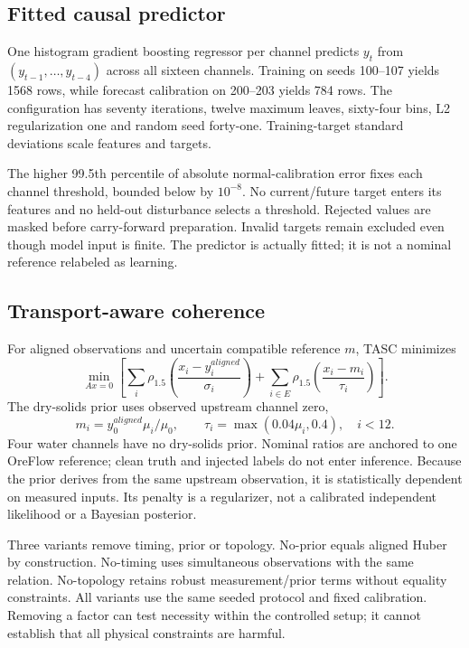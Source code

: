 \documentclass[11pt,a4paper]{article}
\begin{document}
\subsection{Fitted causal predictor}
One histogram gradient boosting regressor per channel predicts $y_t$ from $(y_{t-1},\ldots,y_{t-4})$ across all sixteen channels. Training on seeds 100--107 yields 1568 rows, while forecast calibration on 200--203 yields 784 rows. The configuration has seventy iterations, twelve maximum leaves, sixty-four bins, L2 regularization one and random seed forty-one. Training-target standard deviations scale features and targets.

The higher 99.5th percentile of absolute normal-calibration error fixes each channel threshold, bounded below by $10^{-8}$. No current/future target enters its features and no held-out disturbance selects a threshold. Rejected values are masked before carry-forward preparation. Invalid targets remain excluded even though model input is finite. The predictor is actually fitted; it is not a nominal reference relabeled as learning.

\subsection{Transport-aware coherence}
For aligned observations and uncertain compatible reference $m$, TASC minimizes
\begin{equation}
 \min_{Ax=0}\left[\sum_i\rho_{1.5}\left(\frac{x_i-y_i^{aligned}}{\sigma_i}\right)
 +\sum_{i\in E}\rho_{1.5}\left(\frac{x_i-m_i}{\tau_i}\right)\right].
\end{equation}
The dry-solids prior uses observed upstream channel zero,
\begin{equation}
 m_i=y_0^{aligned}\mu_i/\mu_0,\qquad
 \tau_i=\max(0.04\mu_i,0.4),\quad i<12.
\end{equation}
Four water channels have no dry-solids prior. Nominal ratios are anchored to one OreFlow reference; clean truth and injected labels do not enter inference. Because the prior derives from the same upstream observation, it is statistically dependent on measured inputs. Its penalty is a regularizer, not a calibrated independent likelihood or a Bayesian posterior.

Three variants remove timing, prior or topology. No-prior equals aligned Huber by construction. No-timing uses simultaneous observations with the same relation. No-topology retains robust measurement/prior terms without equality constraints. All variants use the same seeded protocol and fixed calibration. Removing a factor can test necessity within the controlled setup; it cannot establish that all physical constraints are harmful.
\end{document}
